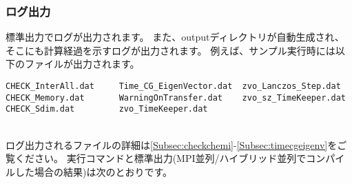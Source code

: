 \subsubsection{ログ出力}
標準出力でログが出力されます。
また、outputディレクトリが自動生成され、
そこにも計算経過を示すログが出力されます。
例えば、サンプル実行時には以下のファイルが出力されます。\\
\begin{minipage}{16cm}
\begin{screen}
\begin{verbatim}
CHECK_InterAll.dat     Time_CG_EigenVector.dat  zvo_Lanczos_Step.dat  
CHECK_Memory.dat       WarningOnTransfer.dat    zvo_sz_TimeKeeper.dat
CHECK_Sdim.dat         zvo_TimeKeeper.dat
\end{verbatim}
\end{screen}
\end{minipage}
\\
ログ出力されるファイルの詳細は\ref{Subsec:checkchemi}-\ref{Subsec:timecgeigenv}をご覧ください。
%
実行コマンドと標準出力{(MPI並列/ハイブリッド並列でコンパイルした場合の結果)}は次のとおりです。


